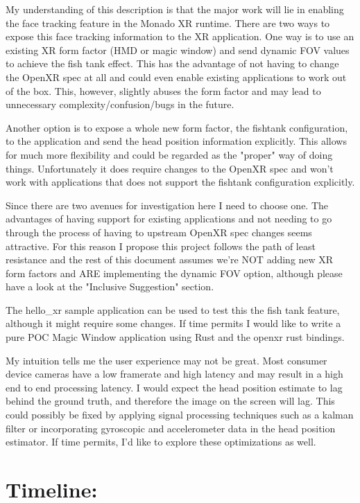 \begin{normalsize}
\begin{quote}
\end{quote}

My understanding of this description is that the major work will lie in enabling
the face tracking feature in the Monado XR runtime. There are two ways to expose
this face tracking information to the XR application. One way is to use an
existing XR form factor (HMD or magic window) and send dynamic FOV values to
achieve the fish tank effect. This has the advantage of not having to change the
OpenXR spec at all and could even enable existing applications to work out of the
box. This, however, slightly abuses the form factor and may lead to unnecessary
complexity/confusion/bugs in the future.

Another option is to expose a whole new form factor, the fishtank configuration,
to the application and send the head position information explicitly. This allows
for much more flexibility and could be regarded as the "proper" way of doing
things.  Unfortunately it does require changes to the OpenXR spec and won't work
with applications that does not support the fishtank configuration explicitly.

Since there are two avenues for investigation here I need to choose one. The
advantages of having support for existing applications and not needing to go
through the process of having to upstream OpenXR spec changes seems attractive.
For this reason I propose this project follows the path of least resistance and
the rest of this document assumes we're NOT adding new XR form factors and ARE
implementing the dynamic FOV option, although please have a look at the "Inclusive
Suggestion" section.

The hello\_xr sample application can be used to test this the fish tank feature,
although it might require some changes. If time permits I would like to write a
pure POC Magic Window application using Rust and the openxr rust bindings.

My intuition tells me the user experience may not be great. Most consumer device
cameras have a low framerate and high latency and may result in a high end to end
processing latency. I would expect the head position estimate to lag behind the
ground truth, and therefore the image on the screen will lag. This could possibly
be fixed by applying signal processing techniques such as a kalman filter or
incorporating gyroscopic and accelerometer data in the head position estimator. If
time permits, I'd like to explore these optimizations as well.

\section{Timeline:}


\end{normalsize}
